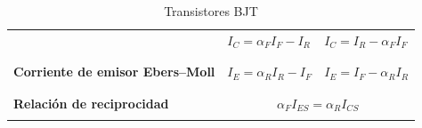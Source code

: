 \documentclass[11pt]{article}
\begin{document}
\begin{table}
\begin{tabular}{|p{4.2cm}|l|l|}
		          & $I_C = \alpha_F I_F - I_R$
		          & $I_C = I_R - \alpha_F I_F$                                                                                  \\
		          &                                                                                                       &     \\
		\hline
		          &                                                                                                       &     \\
		\textbf{Corriente de emisor Ebers--Moll}
		          & $I_E = \alpha_R I_R - I_F$
		          & $I_E = I_F - \alpha_R I_R$                                                                                  \\
		          &                                                                                                       &     \\
		\hline
		          & \multicolumn{2}{|c|}{}                                                                                      \\
		\textbf{Relación de reciprocidad}
		          & \multicolumn{2}{|c|}{$\alpha_F I_{ES} = \alpha_R I_{CS}$}                                                   \\
		          & \multicolumn{2}{|c|}{}                                                                                      \\
		\hline
	\end{tabular}
	\caption{Transistores BJT}
\end{table}
\end{document}
